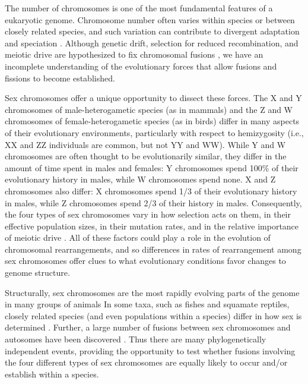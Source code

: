The number of chromosomes is one of the most fundamental features of a eukaryotic genome. Chromosome number often varies within species or between closely related species, and such variation can contribute to divergent adaptation and speciation \citep{White1971, King1993}. Although genetic drift, selection for reduced recombination, and meiotic drive are hypothesized to fix chromosomal fusions \citep{Nachman1995, Guerrero2014}, we have an incomplete understanding of the evolutionary forces that allow fusions and fissions to become established.

Sex chromosomes offer a unique opportunity to dissect these forces. The X and Y chromosomes of male-heterogametic species (as in mammals) and the Z and W chromosomes of female-heterogametic species (as in birds) differ in many aspects of their evolutionary environments, particularly with respect to hemizygosity (i.e., XX and ZZ individuals are common, but not YY and WW). While Y and W chromosomes are often thought to be evolutionarily similar, they differ in the amount of time spent in males and females: Y chromosomes spend 100\% of their evolutionary history in males, while W chromosomes spend none. X and Z chromosomes also differ: X chromosomes spend 1/3 of their evolutionary history in males, while Z chromosomes spend 2/3 of their history in males. Consequently, the four types of sex chromosomes vary in how selection acts on them, in their effective population sizes, in their mutation rates, and in the relative importance of meiotic drive \citep{Ellegren2011, Backtrog2011, Perrinbook}. All of these factors could play a role in the evolution of chromosomal rearrangements, and so differences in rates of rearrangement among sex chromosomes offer clues to what evolutionary conditions favor changes to genome structure.

Structurally, sex chromosomes are the most rapidly evolving parts of the genome in many groups of animals \citep{White1973, Bull1983, Ezaz2006,Perrinbook} In some taxa, such as fishes and squamate reptiles, closely related species (and even populations within a species) differ in how sex is determined \citep{Ezaz2006, Bachtrog2014}. Further, a large number of fusions between sex chromosomes and autosomes have been discovered \citep{White1971, ToS}. Thus there are many phylogenetically independent events, providing the opportunity to test whether fusions involving the four different types of sex chromosomes are equally likely to occur and/or establish within a species.
 
